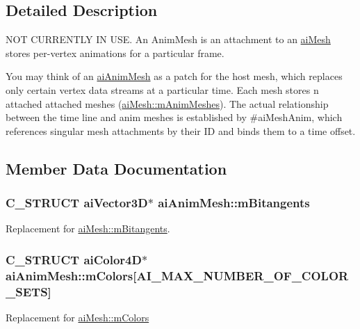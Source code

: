 \subsection{Detailed Description}
N\+OT C\+U\+R\+R\+E\+N\+T\+LY IN U\+SE. An Anim\+Mesh is an attachment to an \hyperlink{structai_mesh}{ai\+Mesh} stores per-\/vertex animations for a particular frame. 

You may think of an \hyperlink{structai_anim_mesh}{ai\+Anim\+Mesh} as a {\ttfamily patch} for the host mesh, which replaces only certain vertex data streams at a particular time. Each mesh stores n attached attached meshes (\hyperlink{structai_mesh_a5078f7db7e99ed05db89dfa412f0e990}{ai\+Mesh\+::m\+Anim\+Meshes}). The actual relationship between the time line and anim meshes is established by \#ai\+Mesh\+Anim, which references singular mesh attachments by their ID and binds them to a time offset. 

\subsection{Member Data Documentation}
\subsubsection[{\texorpdfstring{m\+Bitangents}{mBitangents}}]{\setlength{\rightskip}{0pt plus 5cm}C\+\_\+\+S\+T\+R\+U\+CT {\bf ai\+Vector3D}$\ast$ ai\+Anim\+Mesh\+::m\+Bitangents}\hypertarget{structai_anim_mesh_a7d60acf4d2b4b59dcc6c88956bfae85f}{}\label{structai_anim_mesh_a7d60acf4d2b4b59dcc6c88956bfae85f}
Replacement for \hyperlink{structai_mesh_ab2a81bfe1731f01271ebab274a8f01c4}{ai\+Mesh\+::m\+Bitangents}. 
\subsubsection[{\texorpdfstring{m\+Colors}{mColors}}]{\setlength{\rightskip}{0pt plus 5cm}C\+\_\+\+S\+T\+R\+U\+CT {\bf ai\+Color4D}$\ast$ ai\+Anim\+Mesh\+::m\+Colors\mbox{[}A\+I\+\_\+\+M\+A\+X\+\_\+\+N\+U\+M\+B\+E\+R\+\_\+\+O\+F\+\_\+\+C\+O\+L\+O\+R\+\_\+\+S\+E\+TS\mbox{]}}\hypertarget{structai_anim_mesh_a4f062d9fac71c6b367fdf0f8638e1ca5}{}\label{structai_anim_mesh_a4f062d9fac71c6b367fdf0f8638e1ca5}
Replacement for \hyperlink{structai_mesh_ad9215f67bd0c2277b10775a8adb66b96}{ai\+Mesh\+::m\+Colors} 
